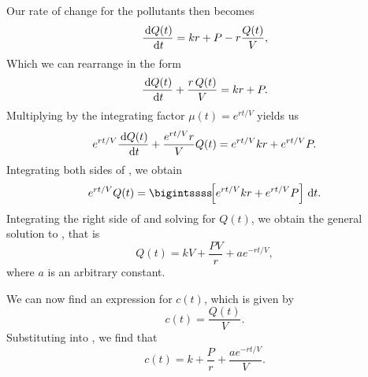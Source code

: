 \begin{ex}
\begin{enumerate}
\begin{sol}
          Our rate of change for the pollutants then becomes
          \begin{equation}
            \frac{\,\mathrm{d} Q(t)}{\,\mathrm{d} t} = kr+P-r\frac{Q(t)}{V},
            \label{dqdt}
          \end{equation}
          Which we can rearrange in the form
          \begin{equation}
            \frac{\,\mathrm{d} Q(t)}{\,\mathrm{d} t}+\frac{r\, Q(t)}{V} = kr+P.
            \label{dqdtr}
          \end{equation}
          Multiplying  by the integrating factor $\mu (t)=e^{rt/V}$ yields us
          \begin{equation}
            e^{rt/V}\frac{\,\mathrm{d} Q(t)}{\,\mathrm{d} t}+\frac{e^{rt/V}r}{V}Q(t) = e^{rt/V}kr+e^{rt/V}P.
            \label{dqif}
          \end{equation}
          Integrating both sides of , we obtain
          \begin{equation}
            e^{rt/V}Q(t) = \bigintssss \! \! \left[ e^{rt/V} kr + e^{rt/V}P\right] \ud t.
            \label{qint}
          \end{equation}
          Integrating the right side of  and solving for $Q(t)$, we obtain the general solution to , that is
          \begin{equation}
            Q(t) =  kV+\frac{PV}{r}+a e^{-rt/V},
            \label{qtsol}
          \end{equation}
          where $a$ is an arbitrary constant.

          We can now find an expression for $c(t)$, which is given by
          \begin{equation}
            c(t) =\frac{Q(t)}{V}.
            \label{ct}
          \end{equation}
          Substituting  into , we find that
          \begin{equation}
            c(t) = k + \frac{P}{r}+\frac{a e^{-rt/V}}{V}.
            \label{ct2}
          \end{equation}


\end{sol}
\end{enumerate}
\end{ex}
